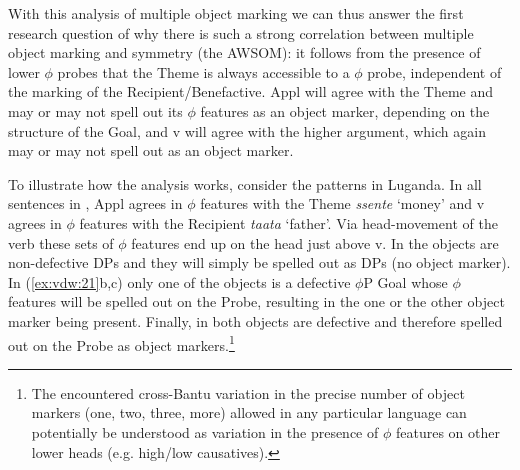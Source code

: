 \documentclass[output=paper
,modfonts
,nonflat]{langsci/langscibook}
\begin{document}
With this analysis of multiple object marking we can thus answer the first research question of why there is such a strong correlation between multiple object marking and symmetry (the AWSOM): it follows from the presence of lower $\phi$ probes that the Theme is always accessible to a $\phi$ probe, independent of the marking of the Recipient/Benefactive. Appl will agree with the Theme and may or may not spell out its $\phi$ features as an object marker, depending on the structure of the Goal, and v will agree with the higher argument, which again may or may not spell out as an object marker. 

To illustrate how the analysis works, consider the patterns in Luganda. In all sentences in , Appl agrees in $\phi $ features with the Theme \textit{ssente} ‘money’ and v agrees in $\phi$ features with the Recipient \textit{taata} ‘father’. Via head-movement of the verb these sets of $\phi$ features end up on the head just above v. In  the objects are non-defective DPs and they will simply be spelled out as DPs (no object marker). In (\ref{ex:vdw:21}b,c) only one of the objects is a defective $\phi$P Goal whose $\phi$ features will be spelled out on the Probe, resulting in the one or the other object marker being present. Finally, in  both objects are defective and therefore spelled out on the Probe as object markers.\footnote{The encountered cross-Bantu variation in the precise number of object markers (one, two, three, more) allowed in any particular language \citep{Polak1986, Marlo2015} can potentially be understood as variation in the presence of $\phi$ features on other lower heads (e.g. high/low causatives).}

\end{document}
